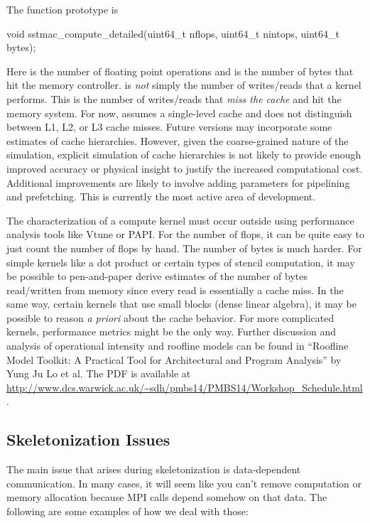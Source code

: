 The function prototype is

\begin{CppCode}
void sstmac_compute_detailed(uint64_t nflops, uint64_t nintops, uint64_t bytes);
\end{CppCode}
Here  is the number of floating point operations and  is the number of bytes that hit the memory controller.
 is \emph{not} simply the number of writes/reads that a kernel performs.
This is the number of writes/reads that \emph{miss the cache} and hit the memory system.
For now, \sstmacro assumes a single-level cache and does not distinguish between L1, L2, or L3 cache misses.
Future versions may incorporate some estimates of cache hierarchies.
However, given the coarse-grained nature of the simulation, explicit simulation of cache hierarchies is not likely to provide enough improved accuracy or physical insight to justify the increased computational cost. 
Additional improvements are likely to involve adding parameters for pipelining and prefetching.
This is currently the most active area of \sstmacro development.

The characterization of a compute kernel must occur outside \sstmacro using performance analysis tools like Vtune or PAPI.
For the number of flops, it can be quite easy to just count the number of flops by hand.
The number of bytes is much harder.
For simple kernels like a dot product or certain types of stencil computation, 
it may be possible to pen-and-paper derive estimates of the number of bytes read/written from memory since every read is essentially a cache miss.
In the same way, certain kernels that use small blocks (dense linear algebra), it may be possible to reason \textit{a priori} about the cache behavior.
For more complicated kernels, performance metrics might be the only way.
Further discussion and analysis of operational intensity and roofline models can be found in ``Roofline Model Toolkit: A Practical Tool for Architectural and Program Analysis'' by Yung Ju Lo et al.  The PDF is available at \url{http://www.dcs.warwick.ac.uk/~sdh/pmbs14/PMBS14/Workshop_Schedule.html}.

\subsection{Skeletonization Issues}
\label{subsec:skeletonIssues}

The main issue that arises during skeletonization is data-dependent communication.  In many cases, it will seem like you can't remove computation or memory allocation because MPI calls depend somehow on that data.  The following are some examples of how we deal with those:

